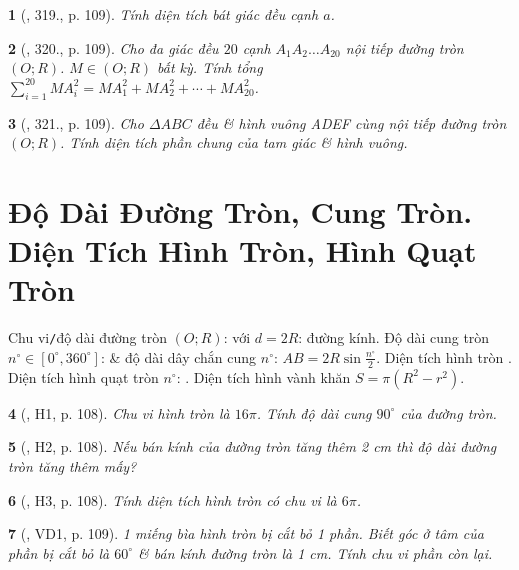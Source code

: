 \documentclass{article}
\newtheorem{baitoan}{}
\begin{document}
\begin{baitoan}[\cite{Binh_Toan_9_tap_2}, 319., p. 109]
	Tính diện tích bát giác đều cạnh $a$.
\end{baitoan}

\begin{baitoan}[\cite{Binh_Toan_9_tap_2}, 320., p. 109]
	Cho đa giác đều $20$ cạnh $A_1A_2\ldots A_{20}$ nội tiếp đường tròn $(O;R)$. $M\in(O;R)$ bất kỳ. Tính tổng $\sum_{i=1}^{20} MA_i^2 = MA_1^2 + MA_2^2 + \cdots + MA_{20}^2$.
\end{baitoan}

\begin{baitoan}[\cite{Binh_Toan_9_tap_2}, 321., p. 109]
	Cho $\Delta ABC$ đều \& hình vuông ADEF cùng nội tiếp đường tròn $(O;R)$. Tính diện tích phần chung của tam giác \& hình vuông.
\end{baitoan}


\section{Độ Dài Đường Tròn, Cung Tròn. Diện Tích Hình Tròn, Hình Quạt Tròn}
 Chu vi{\tt/}độ dài đường tròn $(O;R)$:  với $d = 2R$: đường kính. Độ dài cung tròn $n^\circ\in[0^\circ,360^\circ]$:  \& độ dài dây chắn cung $n^\circ$: $AB = 2R\sin\frac{n^\circ}{2}$.  Diện tích hình tròn . Diện tích hình quạt tròn $n^\circ$: .  Diện tích hình vành khăn $S = \pi(R^2 - r^2)$.

\begin{baitoan}[\cite{Binh_boi_duong_Toan_9_tap_2}, H1, p. 108]
	Chu vi hình tròn là $16\pi$. Tính độ dài cung $90^\circ$ của đường tròn.
\end{baitoan}

\begin{baitoan}[\cite{Binh_boi_duong_Toan_9_tap_2}, H2, p. 108]
	Nếu bán kính của đường tròn tăng thêm {\rm2 cm} thì độ dài đường tròn tăng thêm mấy?
\end{baitoan}

\begin{baitoan}[\cite{Binh_boi_duong_Toan_9_tap_2}, H3, p. 108]
	Tính diện tích hình tròn có chu vi là $6\pi$.
\end{baitoan}

\begin{baitoan}[\cite{Binh_boi_duong_Toan_9_tap_2}, VD1, p. 109]
	1 miếng bìa hình tròn bị cắt bỏ 1 phần. Biết góc ở tâm của phần bị cắt bỏ là $60^\circ$ \& bán kính đường tròn là {\rm1 cm}. Tính chu vi phần còn lại.
\end{baitoan}
\end{document}
